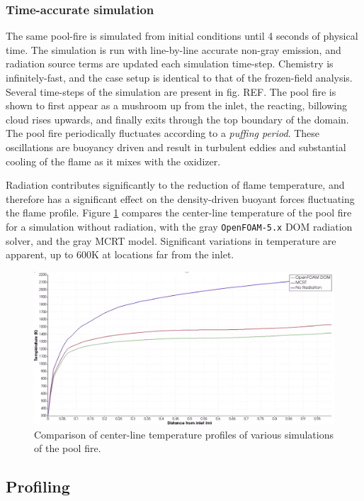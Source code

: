 \subsubsection{Time-accurate simulation}
The same pool-fire is simulated from initial conditions until 4 seconds of physical time.
The simulation is run with line-by-line accurate non-gray emission, and radiation source terms are updated each simulation time-step. Chemistry is infinitely-fast, and the case setup is identical to that of the frozen-field analysis.
Several time-steps of the simulation are present in fig. REF. The pool fire is shown to first appear as a mushroom up from the inlet, the reacting, billowing cloud rises upwards, and finally exits through the top boundary of the domain.
The pool fire periodically fluctuates according to a \textit{puffing period}. These oscillations are buoyancy driven and result in turbulent eddies and substantial cooling of the flame as it mixes with the oxidizer.

Radiation contributes significantly to the reduction of flame temperature, and therefore has a significant effect on the density-driven buoyant forces fluctuating the flame profile. 
Figure \ref{fig:PoolFire_withandwithoutrad} compares the center-line temperature of the pool fire for a simulation without radiation, with the gray \verb|OpenFOAM-5.x| DOM radiation solver, and the gray MCRT model. Significant variations in temperature are apparent, up to $600$K at locations far from the inlet.


\begin{figure}
\centering
\includegraphics[width=1\linewidth]{figures/ch4/PoolFire_WithandWithoutRadiation.png}
\caption{Comparison of center-line temperature profiles of various simulations of the pool fire.}
\label{fig:PoolFire_withandwithoutrad}
\end{figure}

\subsection{Profiling}
